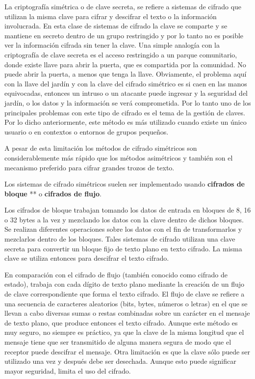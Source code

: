 \documentclass[10pt,a5paper,twoside,,]{book}
\begin{document}
La criptografía simétrica o de clave secreta, se refiere a sistemas de
cifrado que utilizan la misma clave para cifrar y descifrar el texto o
la información involucrada. En esta clase de sistemas de cifrado la
clave se comparte y se mantiene en secreto dentro de un grupo
restringido y por lo tanto no es posible ver la información cifrada sin
tener la clave. Una simple analogía con la criptografía de clave secreta
es el acceso restringido a un parque comunitario, donde existe llave
para abrir la puerta, que es compartida por la comunidad. No puede abrir
la puerta, a menos que tenga la llave. Obviamente, el problema aquí con
la llave del jardín y con la clave del cifrado simétrico es si caen en
las manos equivocadas, entonces un intruso o un atacante puede ingresar
y la seguridad del jardín, o los datos y la información se verá
comprometida. Por lo tanto uno de los principales problemas con este
tipo de cifrado es el tema de la gestión de claves. Por lo dicho
anteriormente, este método es más utilizado cuando existe un único
usuario o en contextos o entornos de grupos pequeños.

A pesar de esta limitación los métodos de cifrado simétricos son
considerablemente más rápido que los métodos asimétricos y también son
el mecanismo preferido para cifrar grandes trozos de texto.

Los sistemas de cifrado simétricos suelen ser implementado usando
\textbf{cifrados de bloque} ** o \textbf{cifrados de flujo}.

Los cifrados de bloque trabajan tomando los datos de entrada en bloques
de 8, 16 o 32 bytes a la vez y mezclando los datos con la clave dentro
de dichos bloques. Se realizan diferentes operaciones sobre los datos
con el fin de transformarlos y mezclarlos dentro de los bloques. Tales
sistemas de cifrado utilizan una clave secreta para convertir un bloque
fijo de texto plano en texto cifrado. La misma clave se utiliza entonces
para descifrar el texto cifrado.

En comparación con el cifrado de flujo (también conocido como cifrado de
estado), trabaja con cada dígito de texto plano mediante la creación de
un flujo de clave correspondiente que forma el texto cifrado. El flujo
de clave se refiere a una secuencia de caracteres aleatorios (bits,
bytes, números o letras) en el que se llevan a cabo diversas sumas o
restas combinadas sobre un carácter en el mensaje de texto plano, que
produce entonces el texto cifrado. Aunque este método es muy seguro, no
siempre es práctico, ya que la clave de la misma longitud que el mensaje
tiene que ser transmitido de alguna manera segura de modo que el
receptor puede descifrar el mensaje. Otra limitación es que la clave
sólo puede ser utilizado una vez y después debe ser desechada. Aunque
esto puede significar mayor seguridad, limita el uso del cifrado.
\end{document}

